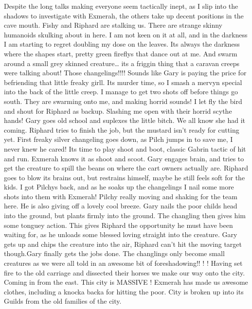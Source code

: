 Despite the long talks making everyone seem tactically inept, as I slip into the shadows to investigate with Exmerah, the others take up decent positions in the cave mouth.\medskip
Fishy and Riphard are stalking us.\medskip
There are strange skinny humanoids skulking about in here. I am not keen on it at all, and in the darkness I am starting to regret doubling my dose on the leaves. Its always the darkness where the shapes start, pretty green fireflys that dance out at me. And swarm around a small grey skinned creature… its a friggin thing that a caravan creeps were talking about! Those changelings!!!! Sounds like Gary is paying the price for befriending that little freaky girll.\medskip
Its murder time, so I smash a mervyn special into the back of the little creep. I manage to get two shots off before things go south. They are swarming onto me, and making horrid sounds! I let fly the bird and shout for Riphard as backup. Slashing me open with their horrid scythe hands!\medskip
Gary goes old school and suplexes the little bitch. We all know she had it coming. Riphard tries to finish the job, but the mustard isn’t ready for cutting yet.\medskip
First freaky silver changeling goes down, as Pilch jumps in to save me, I never knew he cared! Its time to play shoot and boot, classic Gabrin tactic of hit and run. Exmerah knows it as shoot and scoot.\medskip
Gary engages brain, and tries to get the creature to spill the beans on where the cart owners actually are. Riphard goes to blow its brains out, but restrains himself, maybe he still feels soft for the kids.\medskip
I got Pilchys back, and as he soaks up the changelings I nail some more shots into them with Exmerah! Pilchy really moving and shaking for the team here. He is also giving off a lovely cool breeze.\medskip
Gary nails the poor childs head into the ground, but plants firmly into the ground. The changling then gives him some tonguey action. This gives Riphard the opportunity he must have been waiting for, as he unloads some blessed loving straight into the creature.\medskip
Gary gets up and chips the creature into the air, Riphard can’t hit the moving target though.Gary finally gets the jobs done.\medskip
The changlings only become small creatures as we were all told in an awesome bit of foreshadowing!! ! !\medskip
Having set fire to the old carriage and dissected their horses we make our way onto the city. Coming in from the east. This city is MASSIVE !\medskip
Exmerah has made us awesome clothes, including a knocka backa for hitting the poor.\medskip
City is broken up into its Guilds from the old families of the city.\medskip
